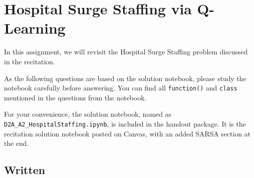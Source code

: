 \documentclass[11pt, letter, answers]{exam}
\begin{document}
\newpage
\section{Hospital Surge Staffing via Q-Learning}
\label{sec:q2}

In this assignment, we will revisit the Hospital Surge Staffing problem discussed in the recitation. 

As the following questions are based on the solution notebook, please study the notebook carefully before answering. You can find all \texttt{function()} and \texttt{class} mentioned in the questions from the notebook.

For your convenience, the solution notebook, named as \texttt{D2A\_A2\_HospitalStaffing.ipynb}, is included in the handout package. It is the recitation solution notebook posted on Canvas, with an added SARSA section at the end.

\subsection{Written}
\end{document}
